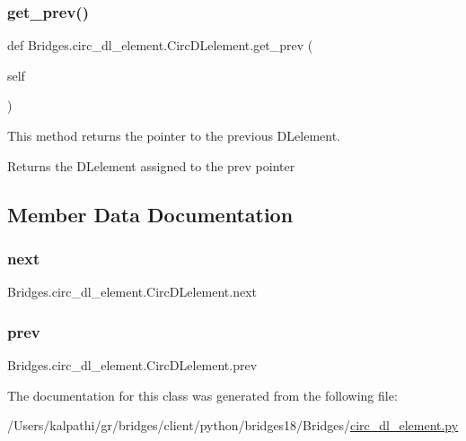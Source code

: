 \subsubsection{\texorpdfstring{get\+\_\+prev()}{get\_prev()}}
{\footnotesize\ttfamily def Bridges.\+circ\+\_\+dl\+\_\+element.\+Circ\+D\+Lelement.\+get\+\_\+prev (\begin{DoxyParamCaption}\item[{}]{self }\end{DoxyParamCaption})}



This method returns the pointer to the previous D\+Lelement. 

\begin{DoxyReturn}{Returns}
the D\+Lelement assigned to the prev pointer 
\end{DoxyReturn}


\subsection{Member Data Documentation}
\mbox{\label{class_bridges_1_1circ__dl__element_1_1_circ_d_lelement_ab22d3f07990637d468acfb7dd47bf905}} 
\subsubsection{\texorpdfstring{next}{next}}
{\footnotesize\ttfamily Bridges.\+circ\+\_\+dl\+\_\+element.\+Circ\+D\+Lelement.\+next}

\mbox{\label{class_bridges_1_1circ__dl__element_1_1_circ_d_lelement_ac52bcf8fb0ce64dfcda81007643510ab}} 
\subsubsection{\texorpdfstring{prev}{prev}}
{\footnotesize\ttfamily Bridges.\+circ\+\_\+dl\+\_\+element.\+Circ\+D\+Lelement.\+prev}



The documentation for this class was generated from the following file\+:\begin{DoxyCompactItemize}
\item 
/\+Users/kalpathi/gr/bridges/client/python/bridges18/\+Bridges/\mbox{\hyperlink{circ__dl__element_8py}{circ\+\_\+dl\+\_\+element.\+py}}\end{DoxyCompactItemize}
